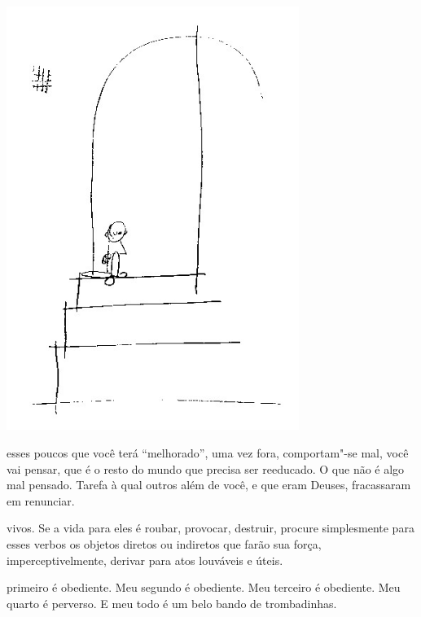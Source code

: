 \begin{vplace}[.50]
\begin{center}
\includegraphics[width=95mm]{./imgs/Image_11.jpg}
\end{center}
\end{vplace}

\pagebreak
\thispagestyle{empty}

\movetooddpage

 esses poucos que você terá ``melhorado'', uma vez fora, comportam"-se
mal, você vai pensar, que é o resto do mundo que precisa ser reeducado.
O que não é algo mal pensado. Tarefa à qual outros além de você, e que
eram Deuses, fracassaram em renunciar.

\bigskip
\bigskip

 vivos. Se a vida para eles é roubar, provocar, destruir,
procure simplesmente para esses verbos os objetos diretos ou indiretos
que farão sua força, imperceptivelmente, derivar para atos louváveis e
úteis.

\bigskip
\bigskip

 primeiro é obediente. Meu segundo é obediente. Meu terceiro é
obediente. Meu quarto é perverso. E meu todo é um belo bando de
trombadinhas.

\bigskip
\bigskip

